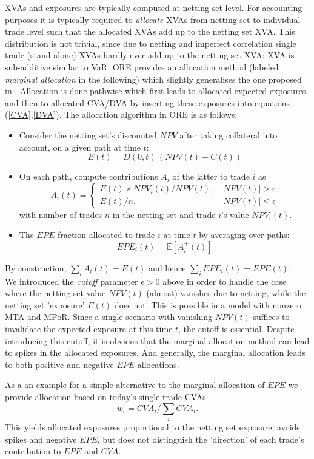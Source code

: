 \documentclass[12pt, a4paper]{article}
\newcommand\E{\ensuremath{\mathbb{E}}}
\newcommand{\NPV}{\mathit{NPV}}
\newcommand{\CVA}{\mathit{CVA}}
\newcommand{\EPE}{\mathit{EPE}}
\begin{document}
\begin{appendix}
XVAs and exposures are typically computed at netting set level. For accounting purposes it is typically required to {\em
  allocate} XVAs from netting set to individual trade level such that the allocated XVAs add up to the netting set
XVA. This distribution is not trivial, since due to netting and imperfect correlation single trade (stand-alone) XVAs
hardly ever add up to the netting set XVA: XVA is sub-additive similar to VaR. ORE provides an allocation method
(labeled {\em marginal allocation } in the following) which slightly generalises the one proposed in
\cite{PykhtinRosen}. Allocation is done pathwise which first leads to allocated expected exposures and then to allocated
CVA/DVA by inserting these exposures into equations (\ref{CVA},\ref{DVA}). The allocation algorithm in ORE is as
follows:
\begin{itemize}
\item Consider the netting set's discounted $\NPV$ after taking collateral into account, on a given path at time $t$:
$$
E(t)=D(0,t)\,(\NPV(t)-C(t))
$$ 
\item On each path, compute contributions $A_i$ of the latter to trade $i$ as
$$
A_{i} (t) = \left\{ \begin{array}{ll} 
E(t) \times \NPV_{i}(t) / \NPV(t), & |\NPV(t)| > \epsilon \\
E(t) / n, & |\NPV(t)| \le \epsilon
\end{array}
\right. 
$$
with number of trades $n$ in the netting set and trade $i$'s value $\NPV_i(t)$.
\item The $\EPE$ fraction allocated to trade $i$ at time $t$ by averaging over paths:
$$
\EPE_i(t) = \E\left[ A_i^+(t) \right]
$$
\end{itemize}
By construction, $\sum_i A_i(t) = E(t)$ and hence $\sum_i \EPE_i(t) = \EPE(t)$.\\

We introduced the {\em cutoff } parameter $\epsilon>0$ above in order to handle the case where the netting set value
$\NPV(t)$ (almost) vanishes due to netting, while the netting set 'exposure' $E(t)$ does not. This is possible in a
model with nonzero MTA and MPoR. Since a single scenario with vanishing $\NPV(t)$ suffices to invalidate the expected
exposure at this time $t$, the cutoff is essential. Despite introducing this cutoff, it is obvious that the marginal
allocation method can lead to spikes in the allocated exposures. And generally, the marginal allocation leads to both
positive and negative $\EPE$ allocations.

\medskip As a an example for a simple alternative to the marginal allocation of $\EPE$ we provide allocation based on
today's single-trade CVAs
$$
w_i = \CVA_i / \sum_i \CVA_i.
$$
This yields allocated exposures proportional to the netting set exposure, avoids spikes and negative $\EPE$, but does
not distinguish the 'direction' of each trade's contribution to $\EPE$ and $\CVA$.


\end{appendix}
\end{document}
